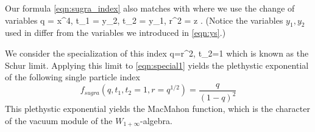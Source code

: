 Our formula \eqref{eqn:sugra_index} also matches with \cite[Eq. (3.24)]{Bhattacharya:2008zy} where we use the change of variables
\beqn
q = x^4, \quad t_1 = y_2, \quad t_2 = y_1, \quad r^2 = z .
\eeqn
(Notice the variables $y_1,y_2$ used in \cite{Bhattacharya:2008zy} differ from the variables we introduced in \eqref{eqn:ys}.)

\parsec 
We consider the specialization of this index 
\beqn
q=r^2, t_2=1 
\eeqn
which is known as the Schur limit.
Applying this limit to \eqref{eqn:special1} yields the plethystic exponential of the following single particle index
\[
f_{sugra}(q, t_1, t_2=1, r = q^{1/2}) = \frac{q}{(1-q)^2}
\]
This plethystic exponential yields the MacMahon function, which is the character of the vacuum module of the $W_{1+\infty}$-algebra.

%
